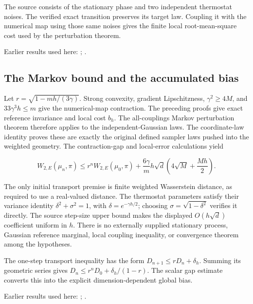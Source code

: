 \documentclass[11pt,a4paper]{report}
\begin{document}
The source consists of the stationary phase and two independent thermostat noises. The verified exact transition preserves its target law. Coupling it with the numerical map using those same noises gives the finite local root-mean-square cost used by the perturbation theorem.



Earlier results used here: \cite[Section~3.33.5]{LangevinLean2026ULASC}; \cite[Section~3.33.6]{LangevinLean2026ULASC}.
\subsection{\texorpdfstring{The Markov bound and the accumulated bias}{The Markov bound and the accumulated bias}}
\label{report-step-KineticLangevin-OBABOBias-lean-3}


Let \(r=\sqrt{1-mh/(3\gamma)}\). Strong convexity, gradient Lipschitzness, \(\gamma^2\ge4M\), and \(33\gamma^3h\le m\) give the numerical-map contraction. The preceding proofs give exact reference invariance and local cost \(b_h\). The all-couplings Markov perturbation theorem therefore applies to the independent-Gaussian laws. The coordinate-law identity proves these are exactly the original defined sampler laws pushed into the weighted geometry. The contraction-gap and local-error calculations yield

\[W_{2,E}(\mu_n,\pi)\le r^nW_{2,E}(\mu_0,\pi)+\frac{6\gamma}{m}h\sqrt d\left(4\sqrt M+\frac{Mh}{2}\right).\]

The only initial transport premise is finite weighted Wasserstein distance, as required to use a real-valued distance. The thermostat parameters satisfy their variance identity \(\delta^2+\sigma^2=1\), with \(\delta=e^{-\gamma h/2}\); choosing \(\sigma=\sqrt{1-\delta^2}\) verifies it directly. The source step-size upper bound makes the displayed \(O(h\sqrt d)\) coefficient uniform in \(h\). There is no externally supplied stationary process, Gaussian reference marginal, local coupling inequality, or convergence theorem among the hypotheses.



The one-step transport inequality has the form \(D_{n+1}\le rD_n+\delta_h\). Summing its geometric series gives \(D_n\le r^nD_0+\delta_h/(1-r)\). The scalar gap estimate converts this into the explicit dimension-dependent global bias.



Earlier results used here: \cite[Section~3.17.3]{LangevinLean2026ULASC}; \cite[Section~3.17.4]{LangevinLean2026ULASC}.
\end{document}
